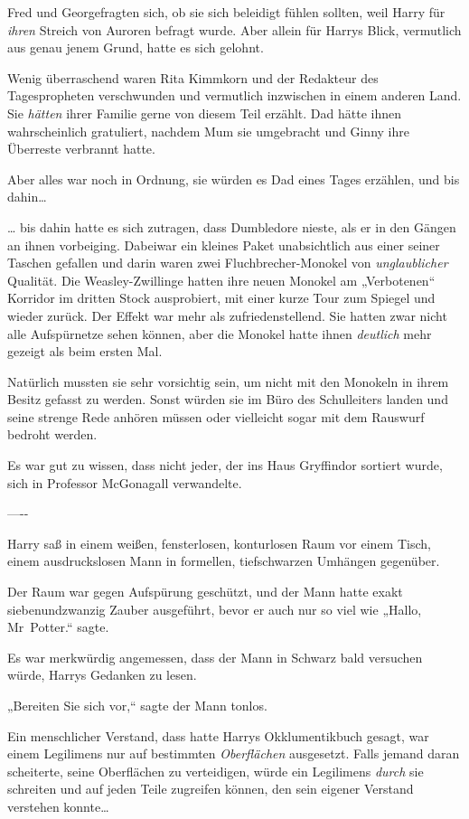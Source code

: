 {Fred und Georgefragten sich, ob sie sich beleidigt fühlen sollten, weil Harry für \emph{ihren} Streich von Auroren befragt wurde. Aber allein für Harrys Blick, vermutlich aus genau jenem Grund, hatte es sich gelohnt.

Wenig überraschend waren Rita Kimmkorn und der Redakteur des Tagespropheten verschwunden und vermutlich inzwischen in einem anderen Land. Sie \emph{hätten} ihrer Familie gerne von diesem Teil erzählt. Dad hätte ihnen wahrscheinlich gratuliert, nachdem Mum sie umgebracht und Ginny ihre Überreste verbrannt hatte.

Aber alles war noch in Ordnung, sie würden es Dad eines Tages erzählen, und bis dahin…

… bis dahin hatte es sich zutragen, dass Dumbledore nieste, als er in den Gängen an ihnen vorbeiging. Dabeiwar ein kleines Paket unabsichtlich aus einer seiner Taschen gefallen und darin waren zwei Fluchbrecher-Monokel von \emph{unglaublicher} Qualität. Die Weasley-Zwillinge hatten ihre neuen Monokel am „Verbotenen“ Korridor im dritten Stock ausprobiert, mit einer kurze Tour zum Spiegel und wieder zurück. Der Effekt war mehr als zufriedenstellend. Sie hatten zwar nicht alle Aufspürnetze sehen können, aber die Monokel hatte ihnen \emph{deutlich} mehr gezeigt als beim ersten Mal.

Natürlich mussten sie sehr vorsichtig sein, um nicht mit den Monokeln in ihrem Besitz gefasst zu werden. Sonst würden sie im Büro des Schulleiters landen und seine strenge Rede anhören müssen oder vielleicht sogar mit dem Rauswurf bedroht werden.

Es war gut zu wissen, dass nicht jeder, der ins Haus Gryffindor sortiert wurde, sich in Professor McGonagall verwandelte.

—\/-\/-

Harry saß in einem weißen, fensterlosen, konturlosen Raum vor einem Tisch, einem ausdruckslosen Mann in formellen, tiefschwarzen Umhängen gegenüber.

Der Raum war gegen Aufspürung geschützt, und der Mann hatte exakt siebenundzwanzig Zauber ausgeführt, bevor er auch nur so viel wie „Hallo, Mr~Potter.“ sagte.

Es war merkwürdig angemessen, dass der Mann in Schwarz bald versuchen würde, Harrys Gedanken zu lesen.

„Bereiten Sie sich vor,“ sagte der Mann tonlos.

Ein menschlicher Verstand, dass hatte Harrys Okklumentikbuch gesagt, war einem Legilimens nur auf bestimmten \emph{Oberflächen} ausgesetzt. Falls jemand daran scheiterte, seine Oberflächen zu verteidigen, würde ein Legilimens \emph{durch} sie schreiten und auf jeden Teile zugreifen können, den sein eigener Verstand verstehen konnte…

}

